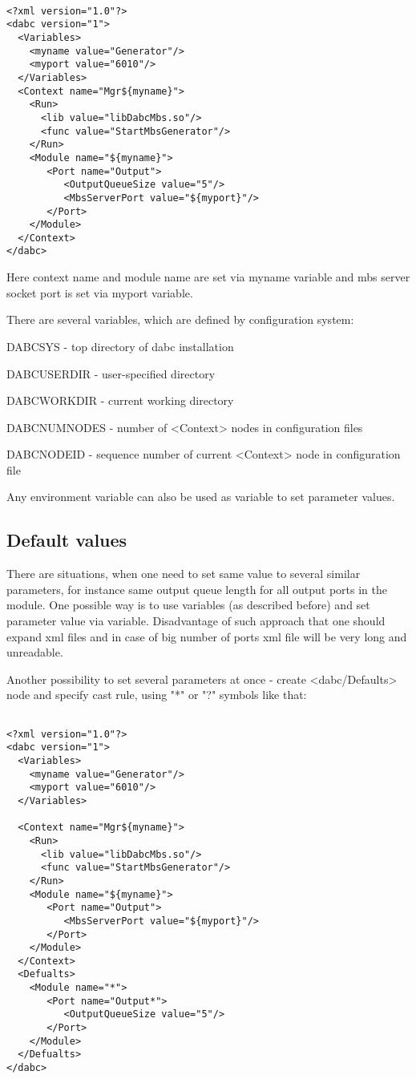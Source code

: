 \begin{verbatim}

<?xml version="1.0"?>
<dabc version="1">
  <Variables>
    <myname value="Generator"/> 
    <myport value="6010"/> 
  </Variables>
  <Context name="Mgr${myname}">
    <Run>
      <lib value="libDabcMbs.so"/>
      <func value="StartMbsGenerator"/>
    </Run>
    <Module name="${myname}">
       <Port name="Output">
          <OutputQueueSize value="5"/>
          <MbsServerPort value="${myport}"/>
       </Port>
    </Module>
  </Context>
</dabc>

\end{verbatim}

Here context name and module name are set via myname variable and mbs server 
socket port is set via myport variable.

There are several variables, which are defined by configuration system:

\bbul
\item DABCSYS - top directory of dabc installation
\item DABCUSERDIR - user-specified directory
\item DABCWORKDIR - current working directory
\item DABCNUMNODES - number of <Context> nodes in configuration files
\item DABCNODEID - sequence number of current <Context> node in configuration file 
\ebul

Any environment variable can also be used as variable to set parameter values. 


\subsection{Default values}

There are situations, when one need to set same value to several similar parameters,
for instance same output queue length for all output ports in the module. One possible way
is to use variables (as described before) and set parameter value via variable. 
Disadvantage of such approach that one should expand xml files and in case 
of big number of ports xml file will be very long and unreadable.

Another possibility to set several parameters at once - create <dabc/Defaults> node and
specify cast rule, using "*" or "?" symbols like that: 

\begin{verbatim}

<?xml version="1.0"?>
<dabc version="1">
  <Variables>
    <myname value="Generator"/> 
    <myport value="6010"/> 
  </Variables>

  <Context name="Mgr${myname}">
    <Run>
      <lib value="libDabcMbs.so"/>
      <func value="StartMbsGenerator"/>
    </Run>
    <Module name="${myname}">
       <Port name="Output">
          <MbsServerPort value="${myport}"/>
       </Port>
    </Module>
  </Context>
  <Defualts>
    <Module name="*">
       <Port name="Output*">
          <OutputQueueSize value="5"/>
       </Port>
    </Module>
  </Defualts>
</dabc>

\end{verbatim}

